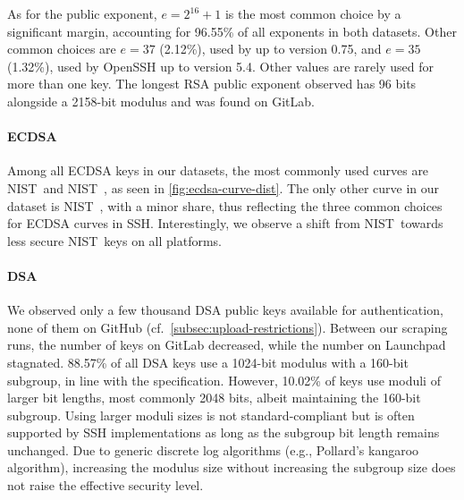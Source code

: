 As for the public exponent, $e = 2^{16} + 1$ is the most common choice by a significant margin, accounting for 96.55\% of all exponents in both datasets. Other common choices are $e = 37$ (2.12\%), used by \putty up to version 0.75, and $e = 35$ (1.32\%), used by OpenSSH up to version 5.4. Other values are rarely used for more than one key. The longest RSA public exponent observed has 96 bits alongside a 2158-bit modulus and was found on GitLab.

\paragraph{ECDSA}

Among all ECDSA keys in our datasets, the most commonly used curves are NIST~\ptwofivesix and NIST~\pfivetwoone, as seen in \autoref{fig:ecdsa-curve-dist}. The only other curve in our dataset is NIST~\pthreeeightfour, with a minor share, thus reflecting the three common choices for ECDSA curves in SSH. Interestingly, we observe a shift from NIST~\pfivetwoone towards less secure NIST~\ptwofivesix keys on all platforms. 

\paragraph{DSA}

We observed only a few thousand DSA public keys available for authentication, none of them on GitHub (cf.~\autoref{subsec:upload-restrictions}). Between our scraping runs, the number of keys on GitLab decreased, while the number on Launchpad stagnated. 88.57\% of all DSA keys use a 1024-bit modulus with a 160-bit subgroup, in line with the specification. However, 10.02\% of keys use moduli of larger bit lengths, most commonly 2048 bits, albeit maintaining the 160-bit subgroup. Using larger moduli sizes is not standard-compliant but is often supported by SSH implementations as long as the subgroup bit length remains unchanged. Due to generic discrete log algorithms (e.g., Pollard's kangaroo~\cite{pollard1978monte} algorithm), increasing the modulus size without increasing the subgroup size does not raise the effective security level.


